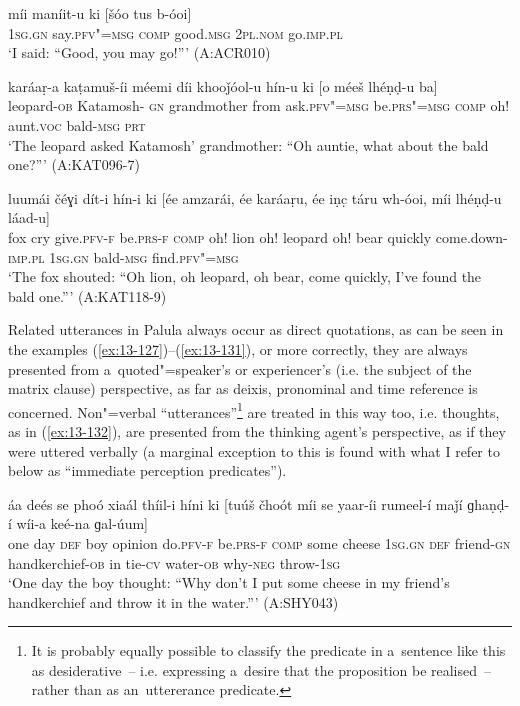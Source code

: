 \begin{exe}
\ex
\label{ex:13-129}
\gll míi maníit-u ki [šóo tus b-óoi]  \\
\textsc{1sg.gn} say.\textsc{pfv"=msg} \textsc{comp} good.\textsc{msg} \textsc{2pl.nom} go.\textsc{imp.pl} \\
\glt `I said: ``Good, you may go!''' (A:ACR010)

\ex
\label{ex:13-130}
\gll karáaṛ-a kaṭamuš-íi méemi díi  khooǰóol-u hín-u ki [o méeš  lhéṇḍ-u ba] \\
leopard-\textsc{ob} Katamosh-\textsc{ gn} grandmother from  ask.\textsc{pfv"=msg} be.\textsc{prs"=msg} \textsc{comp} oh! aunt.\textsc{voc}  bald-\textsc{msg} \textsc{prt } \\
\glt `The leopard asked Katamosh' grandmother: ``Oh auntie, what about the bald one?''' (A:KAT096-7)

\ex
\label{ex:13-131}
\gll luumái čéɣi dít-i hín-i ki [ée amzarái,  ée karáaṛu,
  ée iṇc̣ táru wh-óoi, míi  lhéṇḍ-u láad-u] \\
fox cry give.\textsc{pfv-f} be.\textsc{prs-f} \textsc{comp} oh! lion  oh! leopard oh! bear quickly come.down-\textsc{imp.pl} \textsc{1sg.gn} bald-\textsc{msg} find.\textsc{pfv"=msg}  \\
\glt `The fox shouted: ``Oh lion, oh leopard, oh bear, come quickly, I've found the bald one.''' (A:KAT118-9) 
\end{exe}

Related utterances in Palula always occur as direct quotations, as can be seen in the examples (\ref{ex:13-127})--(\ref{ex:13-131}), or more correctly, they are always presented from a~quoted"=speaker's or experiencer's (i.e. the subject of the matrix clause) perspective, as far as deixis, pronominal and time reference is concerned. Non"=verbal ``utterances''\footnote{It is probably equally possible to classify the predicate in a~sentence like this as desiderative~-- i.e. expressing a~desire that the proposition be realised~-- rather than as an~uttererance predicate.} are treated in this way too, i.e. thoughts, as in (\ref{ex:13-132}), are presented from the thinking agent's perspective, as if they were uttered verbally (a marginal exception to this is found with what I refer to below as ``immediate perception predicates''). 

\begin{exe}
\ex
\label{ex:13-132}
\gll áa deés se phoó xiaál thíil-i híni ki  [tuúš čhoót míi
  se yaar-íi rumeel-í  maǰí ɡhaṇḍ-í wíi-a keé-na ɡal-úum] \\
one day \textsc{def} boy opinion do.\textsc{pfv-f} be.\textsc{prs-f} \textsc{comp}   some cheese \textsc{1sg.gn} \textsc{def} friend-\textsc{gn} handkerchief-\textsc{ob}  in tie-\textsc{cv} water-\textsc{ob} why-\textsc{neg} throw-\textsc{1sg} \\
\glt `One day the boy thought: ``Why don't I put some cheese in my friend's handkerchief and throw it in the water.''' (A:SHY043)
\end{exe}

